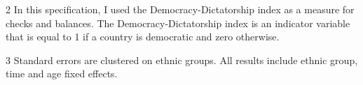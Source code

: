 \begin{table}[htbp]
\begin{adjustbox}{max width=\textwidth}
\begin{threeparttable}[t]
\begin{footnotesize}
\begin{tablenotes}
     \item[2] In this specification, I used the Democracy-Dictatorship index as a measure for checks and balances. The Democracy-Dictatorship index is an indicator variable that is equal to 1 if a country is democratic and zero otherwise.
     \item[3] Standard errors are clustered on ethnic groups. All results include ethnic group, time and age fixed effects.
   \end{tablenotes}
   \end{footnotesize}
    \end{threeparttable}%
\label{tab:ethdemdic}
\end{adjustbox}
\end{table}
